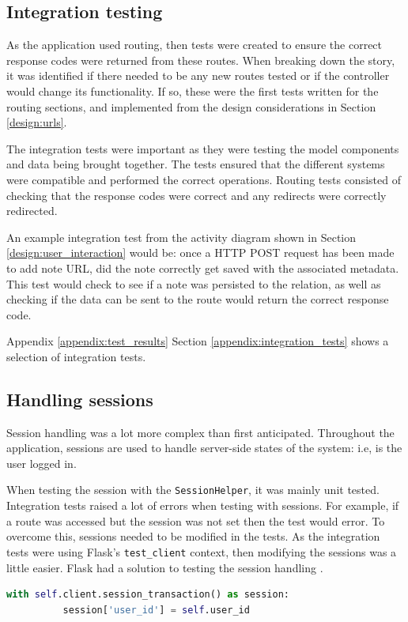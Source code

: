 \subsection{Integration testing}
As the application used routing, then tests were created to ensure the correct response codes were returned from these routes. When breaking down the story, it was identified if there needed to be any new routes tested or if the controller would change its functionality. If so, these were the first tests written for the routing sections, and implemented from the design considerations in Section \ref{design:urls}.

The integration tests were important as they were testing the model components and data being brought together. The tests ensured that the different systems were compatible and performed the correct operations. Routing tests consisted of checking that the response codes were correct and any redirects were correctly redirected.

An example integration test from the activity diagram shown in Section \ref{design:user_interaction} would be: once a HTTP POST request has been made to add note URL, did the note correctly get saved with the associated metadata. This test would check to see if a note was persisted to the relation, as well as checking if the data can be sent to the route would return the correct response code.

Appendix \ref{appendix:test_results} Section \ref{appendix:integration_tests} shows a selection of integration tests.

\subsection{Handling sessions}
Session handling was a lot more complex than first anticipated. Throughout the application, sessions are used to handle server-side states of the system: i.e, is the user logged in.

When testing the session with the \texttt{SessionHelper}, it was mainly unit tested. Integration tests raised a lot of errors when testing with sessions. For example, if a route was accessed but the session was not set then the test would error. To overcome this, sessions needed to be modified in the tests. As the integration tests were using Flask's \texttt{test\_client} context, then modifying the sessions was a little easier. Flask had a solution to testing the session handling \cite{citeulike:14020609}.

\begin{lstlisting}[language=python, label={lst:session}, breaklines, columns=fullflexible, keywordstyle=\color{blue}, basicstyle=\normalsize\ttfamily, caption= {An example of how sessions were handled and modified in the tests.}]
  with self.client.session_transaction() as session:
          session['user_id'] = self.user_id
\end{lstlisting}


